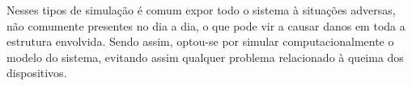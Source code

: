 \documentclass[10pt,fleqn,a4paper]{article}
\begin{document}
Nesses tipos de simulação é comum expor todo o sistema à situações adversas, não
comumente presentes no dia a dia, o que pode vir a causar danos em toda a
estrutura envolvida. Sendo assim, optou-se por simular computacionalmente o
modelo do sistema, evitando assim qualquer problema relacionado à queima dos
dispositivos.

\end{document}
